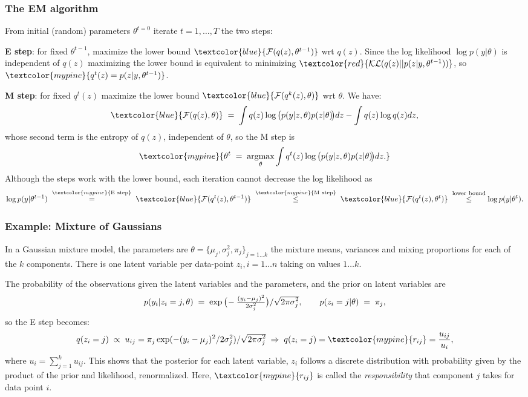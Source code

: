 \documentclass[10pt]{beamer}
\newcommand{\Red}{\textcolor{red}}
\newcommand{\Blue}{\textcolor{blue}}
\newcommand{\Green}{\textcolor{mypine}}
\newcommand{\y}{y}
\newcommand{\z}{z}
\begin{document}
\begin{frame}
\frametitle{The EM algorithm}

From initial (random) parameters $\theta^{t=0}$ iterate $t=1,\ldots,T$ the two steps:

{\bf E step}: for fixed $\theta^{t-1}$, maximize the lower bound $\Blue{{\cal F}(q(\z),\theta^{t-1})}$ wrt $q(\z)$. Since the log likelihood $\log p(\y|\theta)$ is independent of $q(\z)$ maximizing the lower bound is equivalent to minimizing $\Red{{\cal KL}(q(\z)||p(\z|\y,\theta^{t-1}))}$, so $\Green{q^t(\z)=p(\z|\y,\theta^{t-1})}$.

{\bf M step}: for fixed $q^t(\z)$ maximize the lower bound $\Blue{{\cal F}(q^k(\z),\theta)}$ wrt $\theta$. We have:
\[
\Blue{{\cal F}(q(\z),\theta)}\;=\;\int q(\z)\log\big(p(\y|\z,\theta)p(\z|\theta)\!\big)d\z-\int q(\z)\log q(\z)d\z,
\]
whose second term is the entropy of $q(\z)$, independent of $\theta$, so the M step is
\[
\Green{\theta^t\;=\;\underset{\theta}{\rm argmax}\int q^t(\z)\log\big(p(\y|\z,\theta)p(\z|\theta)\!\big)d\z.}
\]
Although the steps work with the lower bound, each iteration cannot decrease the log likelihood as
\[
\log p(\y|\theta^{t-1})\;\overset{\Green{\rm E\ step}}{\!\!\!\!\!\!\phantom{\leq}=}\;\Blue{{\cal F}(q^t(\z),\theta^{t-1})}\;
\overset{\Green{\rm M\ step}}{\leq}\;\Blue{{\cal F}(q^t(\z),\theta^t)}\;
\overset{{\rm lower\ bound}}{\leq}\log p(\y|\theta^t).
\]
\end{frame}

\begin{frame}
\frametitle{Example: Mixture of Gaussians}

In a Gaussian mixture model, the parameters are $\theta=\{\mu_j,\sigma_j^2,\pi_j\}_{j=1\ldots k}$ the mixture
means, variances and mixing proportions for each of the $k$ components. There is one latent variable per data-point $\z_i, i=1\ldots n$ taking on values $1\ldots k$.

The probability of the observations given the latent variables and the parameters, and the prior on latent variables are
\[
p(y_i|\z_i=j,\theta)\;=\;
\exp\big(\!-\tfrac{(y_i-\mu_j)^2}{2\sigma^2_j}\big)/\sqrt{2\pi\smash{\sigma^2_j}},\qquad p(\z_i=j|\theta)\;=\;\pi_j,
\]
so the E step becomes:
\[
q(\z_i=j)\;\propto\;u_{ij}=\pi_j\exp(-(y_i-\mu_j)^2/2\sigma^2_j)/\sqrt{2\pi\smash{\sigma_j^2}}
\;\Rightarrow\;q(\z_i=j)=\Green{r_{ij}}=\frac{u_{ij}}{u_i},
\]
where $u_i=\sum_{j=1}^ku_{ij}$. This shows that the posterior for each latent variable, $\z_i$ follows a discrete distribution with probability given by the product of the prior and likelihood, renormalized. Here, $\Green{r_{ij}}$ is called the \emph{\Green{responsibility}} that component $j$ takes for data point $i$.
\end{frame}
\end{document}
